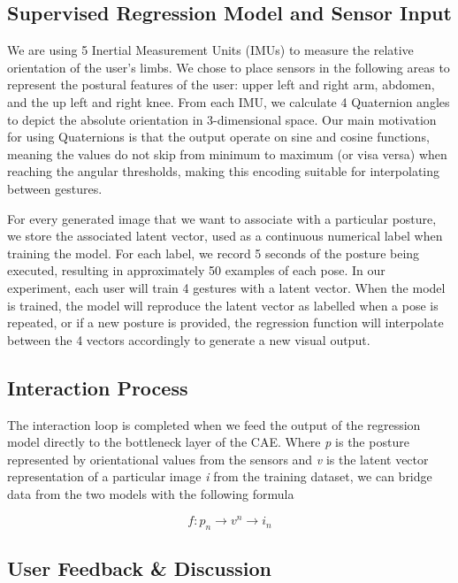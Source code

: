 \subsection{Supervised Regression Model and Sensor Input}\label{sensor_input}

We are using {5} Inertial Measurement Units (IMUs) to measure the relative orientation of the user’s limbs. We chose to place sensors in the following areas to represent the postural features of the user: {upper left and right arm, abdomen, and the up left and right knee}. From each IMU, we calculate 4 Quaternion angles to depict the  absolute orientation in 3-dimensional space. Our main motivation for using Quaternions is that the output operate on sine and cosine functions, meaning the values do not skip from minimum to maximum (or visa versa) when reaching the angular thresholds, making this encoding suitable for interpolating between gestures. 

For every generated image that we want to associate with a particular posture, we store the associated latent vector, used as a continuous numerical label when training the model. For each label, we record 5 seconds of the posture being executed, resulting in approximately 50 examples of each pose. In our experiment, each user will train 4 gestures with a latent vector. When the model is trained, the model will reproduce the latent vector as labelled when a pose is repeated, or if a new posture is provided, the regression function will interpolate between the 4 vectors accordingly to generate a new visual output.

\subsection{Interaction Process}

The interaction loop is completed when we feed the output of the regression model directly to the bottleneck layer of the CAE. Where \textit{p} is the posture represented by orientational values from the sensors and \textit{v} is the latent vector representation of a particular image \textit{i} from the training dataset, we can bridge data from the two models with the following formula 

\[ f:p_n\xrightarrow{}v^n \xrightarrow{}i_n \] 

\subsection{User Feedback \& Discussion}

